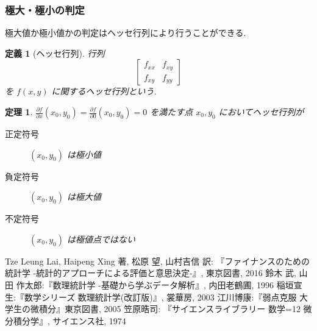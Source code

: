 \documentclass{jsarticle}
\theoremstyle{plain}
\newtheorem{theo}{定理}[section]
\newtheorem{defi}{定義}[section]
\begin{document}
  \subsubsection{極大・極小の判定}
  極大値か極小値かの判定はヘッセ行列により行うことができる.

  \begin{defi}[ヘッセ行列]
    行列
    \begin{equation*}
      \left[
        \begin{array}{ccc}
          f_{xx} & f_{xy} \\
          f_{xy} & f_{yy}
        \end{array}
      \right]
    \end{equation*}
    を $f(x, y)$ に関するヘッセ行列という.
  \end{defi}

  \begin{theo}
    $\frac{\partial f}{\partial x}(x_0, y_0) = \frac{\partial f}{\partial 0}(x_0, y_0) = 0$ を満たす点 $x_0, y_0$ においてヘッセ行列が
    \begin{description}
      \item[正定符号] $(x_0, y_0)$ は極小値
      \item[負定符号] $(x_0, y_0)$ は極大値
      \item[不定符号] $(x_0, y_0)$ は極値点ではない
    \end{description}
  \end{theo}

  \begin{thebibliography}{9}
     Tze Leung Lai, Haipeng Xing 著, 松原 望, 山村吉信 訳: 『ファイナンスのための統計学 -統計的アプローチによる評価と意思決定-』, 東京図書, 2016
     鈴木 武, 山田 作太郎:『数理統計学 -基礎から学ぶデータ解析』, 内田老鶴圃, 1996
     稲垣宣生:『数学シリーズ 数理統計学(改訂版)』, 裳華房, 2003
     江川博康:『弱点克服 大学生の微積分』東京図書, 2005
     笠原晧司: 『サイエンスライブラリー 数学=12 微分積分学』, サイエンス社, 1974
  \end{thebibliography}
\end{document}
